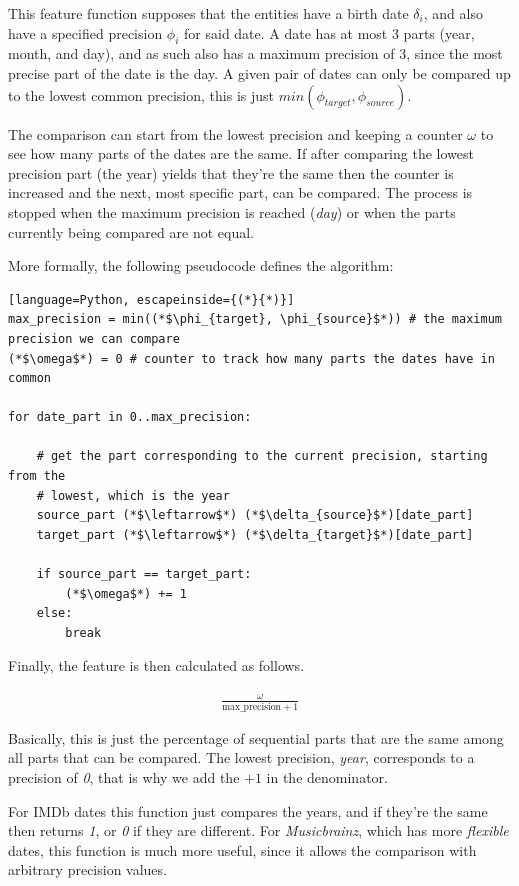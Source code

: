 \documentclass[epsfig,a4paper,11pt,titlepage,twoside,openany]{book}
\begin{document}
This feature function supposes that the entities have a birth date $\delta_i$, and also have a specified precision $\phi_i$ for said date. A date has at most 3 parts (year, month, and day), and as such also has a maximum precision of 3, since the most precise part of the date is the day. A given pair of dates can only be compared up to the lowest common precision, this is just $min(\phi_{target}, \phi_{source})$. 

The comparison can start from the lowest precision and keeping a counter $\omega$ to see how many parts of the dates are the same. If after comparing the lowest precision part (the year) yields that they're the same then the counter is increased and the next, most specific part, can be compared. The process is stopped when the maximum precision is reached (\textit{day}) or when the parts currently being compared are not equal.

More formally, the following pseudocode defines the algorithm:

\begin{lstlisting}[language=Python, escapeinside={(*}{*)}]
max_precision = min((*$\phi_{target}, \phi_{source}$*)) # the maximum precision we can compare
(*$\omega$*) = 0 # counter to track how many parts the dates have in common

for date_part in 0..max_precision:

    # get the part corresponding to the current precision, starting from the 
    # lowest, which is the year
    source_part (*$\leftarrow$*) (*$\delta_{source}$*)[date_part]
    target_part (*$\leftarrow$*) (*$\delta_{target}$*)[date_part]
    
    if source_part == target_part:
        (*$\omega$*) += 1
    else:
        break
\end{lstlisting}

Finally, the feature is then calculated as follows.

\begin{align*} 
\frac{\omega}{\text{max\_precision} + 1}
\end{align*}

Basically, this is just the percentage of sequential parts that are the same among all parts that can be compared. The lowest precision, \textit{year}, corresponds to a precision of \textit{0}, that is why we add the $+1$ in the denominator.

For IMDb dates this function just compares the years, and if they're the same then returns \textit{1}, or \textit{0} if they are different. For \textit{Musicbrainz}, which has more \textit{flexible} dates, this function is much more useful, since it allows the comparison with arbitrary precision values.
 
\end{document}
